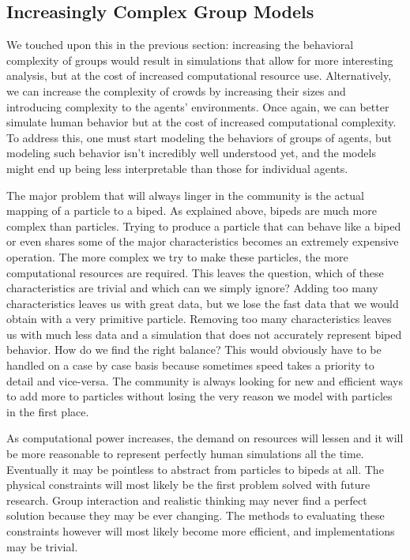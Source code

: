 \documentclass[tog]{acmsiggraph}
\begin{document}
\subsection{Increasingly Complex Group Models}
We touched upon this in the previous section: increasing the behavioral complexity of groups would result in simulations that allow for more interesting analysis, but at the cost of increased computational resource use. Alternatively, we can increase the complexity of crowds by increasing their sizes and introducing complexity to the agents' environments. Once again, we can better simulate human behavior but at the cost of increased computational complexity. To address this, one must start modeling the behaviors of groups of agents, but modeling such behavior isn't incredibly well understood yet, and the models might end up being less interpretable than those for individual agents.

The major problem that will always linger in the community is the actual mapping of a particle to a biped. As explained above, bipeds are much more complex than particles. Trying to produce a particle that can behave like a biped or even shares some of the major characteristics becomes an extremely expensive operation. The more complex we try to make these particles, the more computational resources are required. This leaves the question, which of these characteristics are trivial and which can we simply ignore? Adding too many characteristics leaves us with great data, but we lose the fast data that we would obtain with a very primitive particle. Removing too many characteristics leaves us with much less data and a simulation that does not accurately represent biped behavior. How do we find the right balance? This would obviously have to be handled on a case by case basis because sometimes speed takes a priority to detail and vice-versa. The community is always looking for new and efficient ways to add more to particles without losing the very reason we model with particles in the first place. 


As computational power increases, the demand on resources will lessen and it will be more reasonable to represent perfectly human simulations all the time. Eventually it may be pointless to abstract from particles to bipeds at all. The physical constraints will most likely be the first problem solved with future research. Group interaction and realistic thinking may never find a perfect solution because they may be ever changing. The methods to evaluating these constraints however will most likely become more efficient, and implementations may be trivial.
\end{document}
